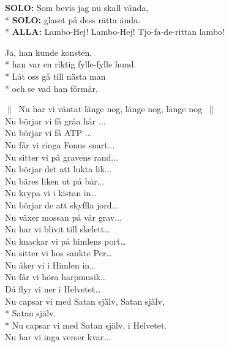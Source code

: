 \begin{SongText}[Lambo]
\begin{SongVerse}
        \textbf{SOLO:} Som bevis jag nu skall vända,\\*%
        \textbf{SOLO:} glaset på dess rätta ända.\\*%
        \textbf{ALLA:} Lambo-Hej! Lambo-Hej! Tjo-fa-de-rittan lambo!
    \end{SongVerse}
    \begin{SongVerse}
        Ja, han kunde konsten,\\*%
        han var en riktig fylle-fylle hund.\\*%
        Låt oss gå till nästa man\\*%
        och se vad han förmår.
    \end{SongVerse}
\end{SongText}
\begin{SongText}
    \begin{SongVerse}
        $\|\:$ Nu har vi väntat länge nog, länge nog, länge nog $\:\|$\\%
        Nu börjar vi få gråa hår ...\\%
        Nu börjar vi få ATP ...\\%
        Nu får vi ringa Fonus snart...\\%
        Nu sitter vi på gravens rand...\\%
        Nu börjar det att lukta lik...\\%
        Nu bäres liken ut på bår...\\%
        Nu krypa vi i kistan in…\\%
        Nu börjar de att skyffla jord…\\%
        Nu växer mossan på vår grav...\\%
        Nu har vi blivit till skelett…\\%
        Nu knackar vi på himlens port…\\%
        Nu sitter vi hos sankte Per…\\%
        Nu åker vi i Himlen in…\\%
        Nu får vi höra harpmusik…\\%
        Då flyr vi ner i Helvetet…\\%
        Nu capsar vi med Satan själv, Satan själv,\\*%
        Satan själv.\\*%
        Nu capsar vi med Satan själv, i Helvetet.\\%
        Nu har vi inga verser kvar...
    \end{SongVerse}
\end{SongText}
